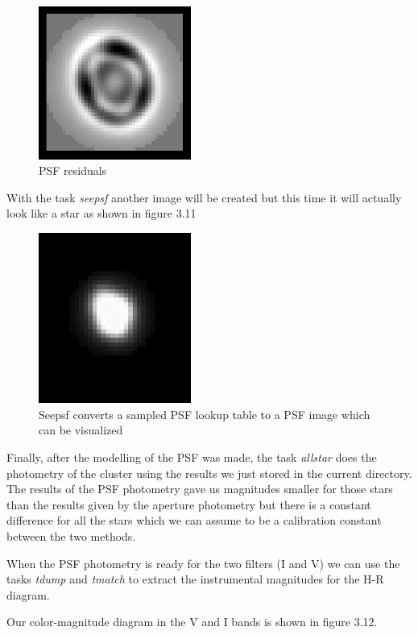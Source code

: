 \begin{figure}[H]
\centering
\includegraphics[width=5cm]{images/psf2.png}
\caption[PSF residuals]{PSF residuals}
\end{figure}

With the task \textit{seepsf} another image will be created but this time it will actually look like a star as shown in figure 3.11

\begin{figure}[H]
\centering
\includegraphics[width=5cm]{images/psf3.png}
\caption[PSF image created by the task Seepsf]{Seepsf converts a sampled PSF lookup table to a PSF image which can be visualized}
\end{figure}

Finally, after the modelling of the PSF was made, the task \textit{allstar} does the photometry of the cluster using the results we just stored in the current directory. The results of the PSF photometry gave us magnitudes smaller for those stars than the results given by the aperture photometry but there is a constant difference for all the stars which we can assume to be a calibration constant between the two methods. 

When the PSF photometry is ready for the two filters (I and V) we can use the tasks \textit{tdump} and \textit{tmatch} to extract the instrumental magnitudes for the H-R diagram. 

Our color-magnitude diagram in the V and I bands is shown in figure 3.12.

